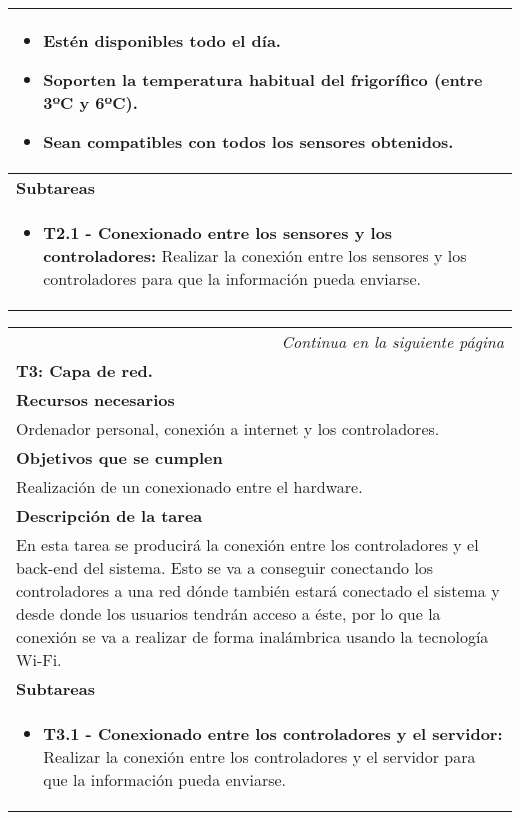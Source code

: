 \begin{longtable}{|p{}|}
    \begin{itemize}
        \item Estén disponibles todo el día. 
        \item Soporten la temperatura habitual del frigorífico (entre 3ºC y 6ºC).
        \item Sean compatibles con todos los sensores obtenidos.
    \end{itemize} \\
    \hline
    \rowcolor[gray]{.9}
    \textbf{Subtareas} \\
    \hline
    \begin{itemize}
        \item \textbf{T2.1 - Conexionado entre los sensores y los controladores:} Realizar la conexión entre los sensores y los controladores para que la información pueda enviarse.
    \end{itemize} \\
    \hline
\end{longtable}

\begin{longtable}{|p{}|}
\hline
\endfirsthead
\endhead
\hline \multicolumn{1}{r}{\textit{Continua en la siguiente página}} \\
\endfoot
\endlastfoot
    \rowcolor[gray]{.5}
    {\color{white}\textbf{T3: Capa de red.}} \\
    \hline
    \rowcolor[gray]{.9}
    \textbf{Recursos necesarios} \\
    \hline
    Ordenador personal, conexión a internet y los controladores. \\
    \hline
    \rowcolor[gray]{.9}
    \textbf{Objetivos que se cumplen} \\
    \hline
    Realización de un conexionado entre el hardware.\\
    \hline
    \rowcolor[gray]{.9}
    \textbf{Descripción de la tarea} \\
    \hline
    En esta tarea se producirá la conexión entre los controladores y el back-end del sistema. Esto se va a conseguir conectando los controladores a una red dónde también estará conectado el sistema y desde donde los usuarios tendrán acceso a éste, por lo que la conexión se va a realizar de forma inalámbrica usando la tecnología Wi-Fi.\\
    \hline
    \rowcolor[gray]{.9}
    \textbf{Subtareas} \\
    \hline
    \begin{itemize}
        \item \textbf{T3.1 - Conexionado entre los controladores y el servidor:} Realizar la conexión entre los controladores y el servidor para que la información pueda enviarse.
    \end{itemize} \\
    \hline
\end{longtable}


